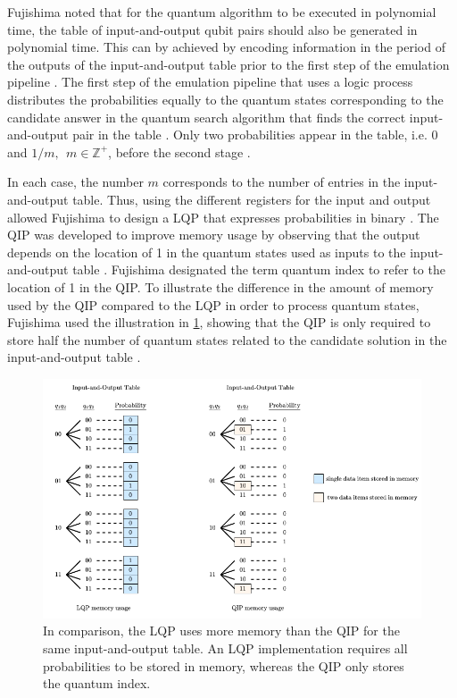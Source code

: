 Fujishima noted that for the quantum algorithm to be executed in polynomial time, the table of input-and-output qubit pairs should also be generated in polynomial time. This can by achieved by encoding information in the period of the outputs of the input-and-output table prior to the first step of the emulation pipeline \cite{fujishima2003fpga}. The first step of the emulation pipeline that uses a logic process distributes the probabilities equally to the quantum states corresponding to the candidate answer in the quantum search algorithm that finds the correct input-and-output pair in the table \cite{fujishima2003fpga}. Only two probabilities appear in the table, i.e. 0 and $1/m,~~m\in\mathbb{Z}^+$, before the second stage \cite{fujishima2003fpga}. 

In each case, the number $m$ corresponds to the number of entries in the input-and-output table. Thus, using the different registers for the input and output allowed Fujishima to design a LQP that expresses probabilities in binary \cite{fujishima2003fpga}. The QIP was developed to improve memory usage by observing that the output depends on the location of 1 in the quantum states used as inputs to the input-and-output table \cite{fujishima2003fpga}. Fujishima designated the term quantum index to refer to the location of 1 in the QIP. To illustrate the difference in the amount of memory used by the QIP compared to the LQP in order to process quantum states, Fujishima used the illustration in \ref{fig:fujishima-lqp-qip}, showing that the QIP is only required to store half the number of quantum states related to the candidate solution in the input-and-output table \cite{fujishima2003fpga}. 

\begin{figure}[!ht]
	\centering
	\includegraphics[width=1.0\linewidth]{body/ch3/figs/fujishima-lqp-qip}
	\caption[Memory Comparison for Logic Quantum Processor (LQP) and Quantum Index Processor (QIP).]{In comparison, the LQP uses more memory than the QIP for the same input-and-output table. An LQP implementation requires all probabilities to be stored in memory, whereas the QIP only stores the quantum index.}
	\label{fig:fujishima-lqp-qip}
\end{figure}

